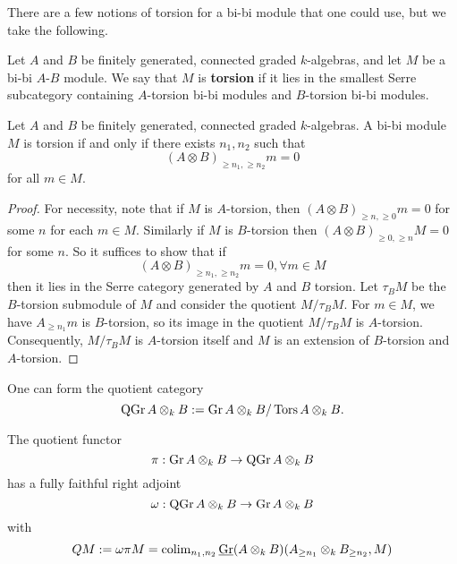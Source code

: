 There are a few notions of torsion for a bi-bi module that one could use, but we take the following.

\begin{definition}
  Let \(A\) and \(B\) be finitely generated, connected graded \(k\)-algebras, and let \(M\) be a bi-bi \(A\)-\(B\) module. We say that \(M\) is \textbf{torsion} if it lies in the smallest Serre subcategory containing \(A\)-torsion bi-bi modules and \(B\)-torsion bi-bi modules.
\end{definition}

\begin{lemma} \label{lemma: alternate char of bibi torsion}
    Let \(A\) and \(B\) be finitely generated, connected graded \(k\)-algebras.
  A bi-bi module \(M\) is torsion if and only if there exists \(n_1,n_2\) such that 
  \begin{displaymath}
    (A \otimes B)_{\geq n_1, \geq n_2} m = 0
  \end{displaymath}
  for all \(m \in M\).
\end{lemma}

\begin{proof}
  For necessity, note that if \(M\) is \(A\)-torsion, then \((A \otimes B)_{\geq n, \geq 0} m = 0\) for some \(n\) for each \(m \in M\).
  Similarly if \(M\) is \(B\)-torsion then \((A \otimes B)_{\geq 0,\geq n} M = 0\) for some \(n\).
  So it suffices to show that if
  \begin{displaymath}
    (A \otimes B)_{\geq n_1, \geq n_2} m = 0 , \forall m \in M
  \end{displaymath}
  then it lies in the Serre category generated by \(A\) and \(B\) torsion. Let \(\tau_B M\) be the \(B\)-torsion submodule of \(M\) and consider the quotient \(M/\tau_B M\). For \(m \in M\), we have \(A_{\geq n_1}m\) is \(B\)-torsion, so its image in the quotient \(M/\tau_B M\) is \(A\)-torsion. Consequently, \(M / \tau_B M\) is \(A\)-torsion itself and \(M\) is an extension of \(B\)-torsion and \(A\)-torsion. 
\end{proof}

One can form the quotient category
\begin{displaymath}
  \operatorname{QGr}A \otimes_k B := \operatorname{Gr}A \otimes_k B / \operatorname{Tors}A \otimes_k B.
\end{displaymath}

\begin{lemma} \label{lemma: biQ and bQGr}
  The quotient functor 
  \begin{displaymath}
    \pi : \operatorname{Gr}A \otimes_k B \to \operatorname{QGr}A \otimes_k B
  \end{displaymath}
  has a fully faithful right adjoint 
  \begin{displaymath}
    \omega : \operatorname{QGr}A \otimes_k B \to \operatorname{Gr}A \otimes_k B
  \end{displaymath}
  with 
  \begin{displaymath}
    QM := \omega \pi M = \operatorname{colim}_{n_1,n_2} \underline{\operatorname{Gr}}(A \otimes_k B)( A_{\geq n_1} \otimes_k B_{\geq n_2} , M)
  \end{displaymath}
\end{lemma}


